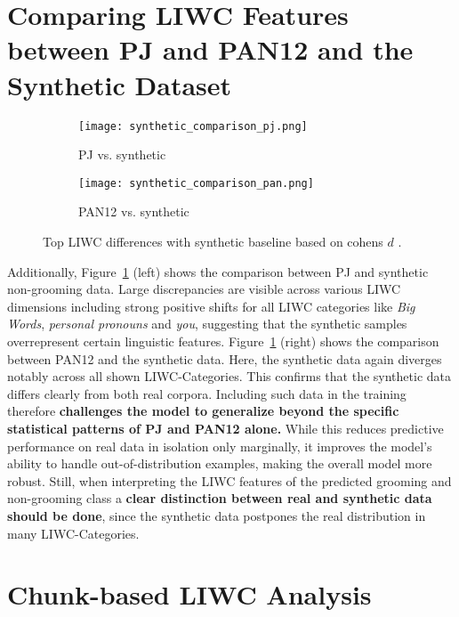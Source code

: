 
\section{Comparing LIWC Features between PJ and PAN12 and the Synthetic Dataset} \label{sec:liwc_synthetic_comparison}
\begin{figure}[ht]
  \centering
  \begin{subfigure}[t]{0.48\textwidth}
    \texttt{[image: synthetic\_comparison\_pj.png]}
    \caption{PJ vs. synthetic}
  \end{subfigure}\hfill
  \begin{subfigure}[t]{0.48\textwidth}
    \texttt{[image: synthetic\_comparison\_pan.png]}
    \caption{PAN12 vs. synthetic}
  \end{subfigure}
  \caption[Top 30 LIWC Differences with Synthetic Baseline]{Top LIWC differences with synthetic baseline based on cohens $d$ \cite{cohen1988}.}
  \label{fig:liwc_synth_side_by_side}
\end{figure}

Additionally, Figure~\ref{fig:liwc_synth_side_by_side} (left) shows the comparison between PJ and synthetic non-grooming data. Large discrepancies are visible across various LIWC dimensions including strong positive shifts for all LIWC categories like \textit{Big Words}, \textit{personal pronouns} and \textit{you}, suggesting that the synthetic samples overrepresent certain linguistic features.  Figure~\ref{fig:liwc_synth_side_by_side} (right) shows the comparison between PAN12 and the synthetic data. Here, the synthetic data again diverges notably across all shown LIWC-Categories. This confirms that the synthetic data differs clearly from both real corpora. Including such data in the training therefore \textbf{challenges the model to generalize beyond the specific statistical patterns of PJ and PAN12 alone.} While this reduces predictive performance on real data in isolation only marginally, it improves the model’s ability to handle out-of-distribution examples, making the overall model more robust. Still, when interpreting the LIWC features of the predicted grooming and non-grooming class a \textbf{clear distinction between real and synthetic data should be done}, since the synthetic data postpones the real distribution in many LIWC-Categories.

\section{Chunk-based LIWC Analysis} \label{sec:chunk_based_liwc_analysis}

